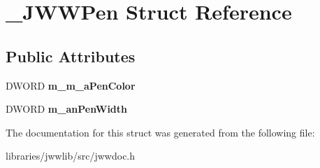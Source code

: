 \hypertarget{struct__JWWPen}{\section{\-\_\-\-J\-W\-W\-Pen Struct Reference}
\label{struct__JWWPen}
}
\subsection*{Public Attributes}
\begin{DoxyCompactItemize}
\item 
\hypertarget{struct__JWWPen_a80655383c1479dae3059f934d6ef1769}{D\-W\-O\-R\-D {\bfseries m\-\_\-m\-\_\-a\-Pen\-Color}}\label{struct__JWWPen_a80655383c1479dae3059f934d6ef1769}

\item 
\hypertarget{struct__JWWPen_ae54bfcebadd027e0707d944b40181318}{D\-W\-O\-R\-D {\bfseries m\-\_\-an\-Pen\-Width}}\label{struct__JWWPen_ae54bfcebadd027e0707d944b40181318}

\end{DoxyCompactItemize}


The documentation for this struct was generated from the following file\-:\begin{DoxyCompactItemize}
\item 
libraries/jwwlib/src/jwwdoc.\-h\end{DoxyCompactItemize}
